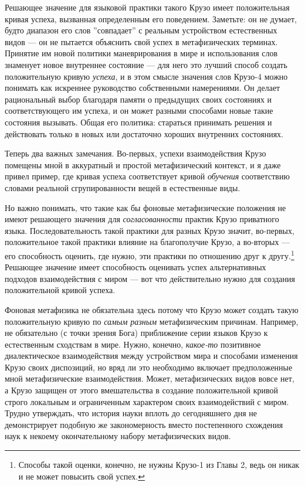 \documentclass[11pt]{book}
\begin{document}
Решающее значение для языковой практики такого Крузо имеет положительная кривая успеха, вызванная определенным его поведением. Заметьте: он не думает, будто диапазон его слов ''совпадает'' с реальным устройством естественных видов --- он не пытается объяснить свой успех в метафизических терминах. Принятие им новой политики маневрирования в мире и использования слов знаменует новое внутреннее состояние --- для него это лучший способ создать положительную кривую \textit{успеха}, и в этом смысле значения слов Крузо-4 можно понимать как искреннее руководство собственными намерениями. Он делает рациональный выбор благодаря памяти о предыдущих своих состояниях и соответствующего им успеха, и он может разными способами новые такие состояния вызывать. Общая его политика: стараться принимать решения и действовать только в новых или достаточно хороших внутренних состояниях.

Теперь два важных замечания. Во-первых, успехи взаимодействия Крузо помещены мной в аккуратный и простой метафизический контекст, и я даже привел пример, где кривая успеха соответствует кривой \textit{обучения} соответствию словами реальной сгрупированности вещей в естественные виды.

Но важно понимать, что такие как бы фоновые метафизические положения не имеют решающего значения для \textit{согласованности} практик Крузо приватного языка. Последовательность такой практики для разных Крузо значит, во-первых, положительное такой практики влияние на благополучие Крузо, а во-вторых --- его способность оценить, где нужно, эти практики по отношению друг к другу.\footnote{Способы такой оценки, конечно, не нужны Крузо-1 из Главы 2, ведь он никак и не может повысить свой успех.} Решающее значение имеет способность оценивать успех альтернативных подходов взаимодействия с миром --- вот что действительно нужно для создания положительной кривой успеха.

Фоновая метафизика не обязательна здесь потому что Крузо может создать такую положительную кривую по \textit{самым разным} метафизическим причинам. Например, не обязательно (с точки зрения Бога) приближение серии языков Крузо к естественным сходствам в мире. Нужно, конечно, \textit{какое-то} позитивное диалектическое взаимодействия между устройством мира и способами изменения Крузо своих диспозиций, но вряд ли это необходимо включает предположенные мной метафизические взаимодействия. Может, метафизических видов вовсе нет, а Крузо защищен от этого вмешательства в создание положительной кривой строго локальным и ограниченным характером своих взаимодействий с миром. Трудно утверждать, что история науки вплоть до сегодняшнего дня не демонстрирует подобную же закономерность вместо постепенного схождения наук к некоему окончательному набору метафизических видов.
\end{document}
